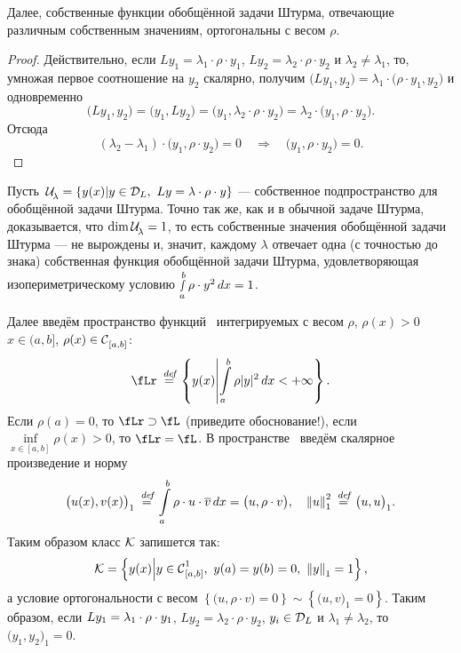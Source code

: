 Далее, собственные функции обобщённой задачи Штурма, отвечающие различным собственным значениям, ортогональны с весом $\rho$. 
\begin{proof}
	Действительно, если $Ly_1=\lambda_1\cdot\rho\cdot y_1$, $Ly_2=\lambda_2\cdot\rho\cdot y_2$ и $\lambda_2\neq\lambda_1$, то, умножая первое соотношение на $y_2$ скалярно, получим $\big(Ly_1,y_2\big)=\lambda_1\cdot\big(\rho\cdot y_1,y_2\big)$ и одновременно
	\begin{equation}
		\label{l8:eq:3}
		\big(Ly_1,y_2\big)=\big(y_1,Ly_2\big)=\big(y_1,\lambda_2\cdot\rho\cdot y_2\big)=\lambda_2\cdot\big(y_1,\rho\cdot y_2\big).
	\end{equation}	
	Отсюда
	\begin{equation}
		(\lambda_2-\lambda_1)\cdot\big(y_1,\rho\cdot y_2\big)=0\quad\Rightarrow\quad\big(y_1,\rho\cdot y_2\big)=0.
	\end{equation}
\end{proof}

Пусть\ $\Ul=\left\{y(x)\middle|y\in\mc{D}_L,\ Ly=\lambda\cdot\rho\cdot y\right\}$ --- собственное подпространство для обобщённой задачи Штурма. Точно так же, как и в обычной задаче Штурма, доказывается, что $\dim\Ul=1$, то есть собственные значения обобщённой задачи Штурма --- не вырождены и, значит, каждому $\lambda$ отвечает одна (с точностью до знака) собственная функция обобщённой задачи Штурма, удовлетворяющая изопериметрическому условию $\smallint\limits_a^b\rho\cdot y^2\,dx=1$.

Далее введём пространство функций \fLr\ интегрируемых с весом $\rho$, $\rho(x)>0$ $x\in(a,b]$, $\rho(x)\in\Cfn[{[a,b]}]{}$:
\begin{equation*}
	\fLr\eqdef\left\{y(x)\middle| \int\limits_a^b\rho|y|^2\,dx<+\infty\right\}.
\end{equation*}
Если $\rho(a)=0$, то $\fLr\supset\fL$ (приведите обоснование!), если $\displaystyle\inf\limits_{x\in[a,b]}\rho(x)>0$, то $\fLr\?=\fL$. В пространстве \fLr\ введём скалярное произведение и норму
\begin{equation*}
	\big(u(x),v(x)\big)_1\eqdef\int\limits_a^b\rho\cdot u\cdot\overline{v}\,dx=\big(u,\rho\cdot v\big),\quad{\norm{u}}_1^2\eqdef\big(u,u\big)_1.
\end{equation*}
Таким образом класс $\K$ запишется так:
\begin{equation*}
	\K=\left\{y(x)\middle|y\in\Cfn[{[a,b]}]{1},\ y(a)=y(b)=0,\ \norm{y}_1=1\right\},
\end{equation*}
а условие ортогональности с весом $\left\{\big(u,\rho\cdot v\big)=0\right\}\sim\left\{\big(u,v\big)_1=0\right\}$. Таким образом, если $Ly_1\?=\lambda_1\cdot\rho\cdot y_1$, $Ly_2=\lambda_2\cdot\rho\cdot y_2$, $y_i\in\mc{D}_L$ и $\lambda_1\neq\lambda_2$, то $\big(y_1,y_2\big)_1=0$.

